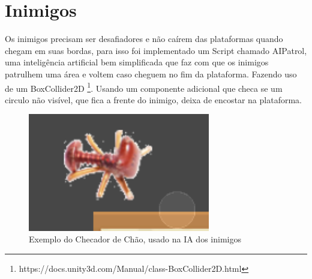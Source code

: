 \section{Inimigos}
Os inimigos precisam ser desafiadores e não caírem das plataformas quando chegam em suas bordas, para isso foi implementado um Script chamado AIPatrol, uma inteligência artificial bem simplificada que faz com que os inimigos patrulhem uma área e voltem caso cheguem no fim da plataforma. Fazendo uso de um BoxCollider2D \footnote{https://docs.unity3d.com/Manual/class-BoxCollider2D.html}. Usando um componente adicional que checa se um circulo não visível, que fica a frente do inimigo, deixa de encostar na plataforma.
\begin{figure}[h]
    \centering
    \includegraphics[width=300px]{figuras/GroundChecker.png}
    \caption{Exemplo do Checador de Chão, usado na IA dos inimigos}
    \label{fig_ground_checker}
\end{figure}

